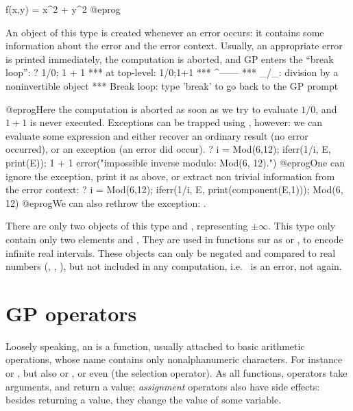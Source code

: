   f(x,y) = x^2 + y^2
@eprog

%
An object of this type is created whenever an error occurs: it contains some
information about the error and the error context. Usually, an appropriate
error is printed immediately, the computation is aborted, and GP enters the
``break loop'':
\bprog
  ? 1/0; 1 + 1
    ***   at top-level: 1/0;1+1
    ***                  ^------
    *** _/_: division by a noninvertible object
    ***   Break loop: type 'break' to go back to the GP prompt

@eprog\noindent Here the computation is aborted as soon as we try to evaluate
$1/0$, and $1 + 1$ is never executed. Exceptions can be trapped
using , however: we can evaluate some expression and either recover
an ordinary result (no error occurred), or an exception (an error did occur).
\bprog
  ? i = Mod(6,12); iferr(1/i, E, print(E)); 1 + 1
  error("impossible inverse modulo: Mod(6, 12).")
@eprog\noindent One can ignore the exception, print it as above, or extract
non trivial information from the error context:
\bprog
  ? i = Mod(6,12); iferr(1/i, E, print(component(E,1)));
  Mod(6, 12)
@eprog\noindent We can also rethrow the exception: .

%

There are only two objects of this type  and , representing
$\pm\infty$. This type only contain only two elements  and ,
They are used in functions sur as  or , to
encode infinite real intervals. These objects can only be negated and
compared to real numbers (, , ), but not
included in any computation, i.e.~ is an error, not  again.

\section{GP operators}\label{se:operators}

\noindent Loosely speaking, an  is a function, usually
attached to basic arithmetic operations, whose name contains only
nonalphanumeric characters. For instance \kbd{+} or \kbd{-}, but also
\kbd{=} or \kbd{+=}, or even \kbd{[ ]} (the selection operator). As all
functions, operators take arguments, and return a value; \emph{assignment}
operators also have side effects: besides returning a value, they change the
value of some variable.


